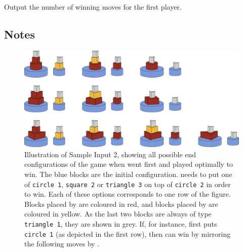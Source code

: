 \vspace{-3mm}
\begin{Output}
  Output the number of winning moves for the first player.
\end{Output}

\begin{afterSample}
  \section*{Notes}
  \begin{figure}[h]
    \includegraphics[width=\textwidth]{sample2}
    \vspace{3mm}
    \caption{
      Illustration of Sample Input 2, showing all possible end configurations of the game when \playerA{}
      went first and played optimally to win. The blue blocks are the initial configuration.
      \playerA{} needs to put one of \texttt{circle 1}, \texttt{square 2} or \texttt{triangle 3}
      on top of \texttt{circle 2} in order to win.
      Each of these options corresponds to one row of the figure.
      Blocks placed by \playerA{} are coloured in red, and blocks placed by \playerB{} are coloured in yellow.
      As the last two blocks are always of type \texttt{triangle 1}, they are shown in grey.
      If, for instance, \playerA{} first puts \texttt{circle 1} (as depicted in the first row),
      then \playerA{} can win by mirroring the following moves by \playerB{}.
    }
  \end{figure}
\end{afterSample}
